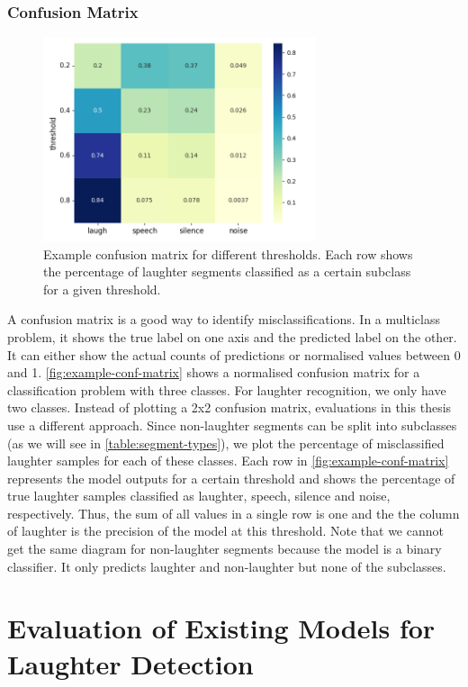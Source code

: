 \documentclass[bsc,frontabs,parskip,deptreport]{infthesis}
\begin{document}
\subsection{Confusion Matrix} \label{sec:conf-matrix}
\begin{figure}[h!]
    \centering
    \includegraphics[width=8cm]{imgs/conf_matrix/init_eval_all.png}
    \caption{Example confusion matrix for different thresholds. Each row shows the percentage of laughter segments classified as a certain subclass for a given threshold.}
    \label{fig:example-conf-matrix}
\end{figure}
A confusion matrix is a good way to identify misclassifications. In a multiclass problem, it shows the true label on one axis and the predicted label on the other. It can either show the actual counts of predictions or normalised values between 0 and 1. \autoref{fig:example-conf-matrix} shows a normalised confusion matrix for a classification problem with three classes.
For laughter recognition, we only have two classes. Instead of plotting a 2x2 confusion matrix, evaluations in this thesis use a different approach.
Since non-laughter segments can be split into subclasses (as we will see in \autoref{table:segment-types}), we plot the percentage of misclassified laughter samples for each of these classes. 
Each row in \autoref{fig:example-conf-matrix} represents the model outputs for a certain threshold and shows the percentage of true laughter samples classified as laughter, speech, silence and noise, respectively. Thus, the sum of all values in a single row is one and the the column of laughter is the precision of the model at this threshold.
Note that we cannot get the same diagram for non-laughter segments because the model is a binary classifier. It only predicts laughter and non-laughter but none of the subclasses. 


\chapter{Evaluation of Existing Models for Laughter Detection} \label{cha:model-evaluation}
\end{document}
